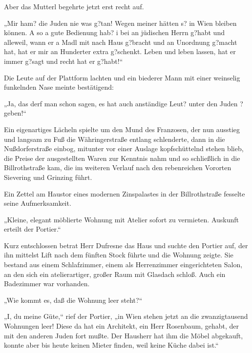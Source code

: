 Aber das Mutterl begehrte jetzt erst recht auf.

„Mir ham? die Juden nie was g?tan! Wegen meiner hätten s? in Wien
bleiben können. A so a gute Bedienung hab? i bei an jüdischen Herrn
g?habt und alleweil, wann er a Madl mit nach Haus g?bracht und an
Unordnung g?macht hat, hat er mir an Hunderter extra g?schenkt.
Leben und leben lassen, hat er immer g?sagt und recht hat er
g?habt!“

Die Leute auf der Plattform lachten und ein biederer Mann mit einer
weinselig funkelnden Nase meinte bestätigend:

„Ja, das derf man schon sagen, es hat auch anständige Leut? unter
den Juden ?geben!“

Ein eigenartiges Lächeln spielte um den Mund des Franzosen, der nun
ausstieg und langsam zu Fuß die Währingerstraße entlang
schlenderte, dann in die Nußdorferstraße einbog, mitunter vor einer
Auslage kopfschüttelnd stehen blieb, die Preise der ausgestellten
Waren zur Kenntnis nahm und so schließlich in die Billrothstraße
kam, die im weiteren Verlauf nach den rebenreichen Vororten
Sievering und Grinzing führt.

Ein Zettel am Haustor eines modernen Zinspalastes in der
Billrothstraße fesselte seine Aufmerksamkeit.

„Kleine, elegant möblierte Wohnung mit Atelier
sofort zu vermieten. Auskunft erteilt der Portier.“

Kurz entschlossen betrat Herr Dufresne das Haus und suchte den
Portier auf, der ihn mittelst Lift nach dem fünften Stock führte
und die Wohnung zeigte. Sie bestand aus einem Schlafzimmer, einem
als Herrenzimmer eingerichteten Salon, an den sich ein
atelierartiger, großer Raum mit Glasdach schloß. Auch ein
Badezimmer war vorhanden.

„Wie kommt es, daß die Wohnung leer steht?“

„I, du meine Güte,“ rief der Portier, „in Wien stehen jetzt an die
zwanzigtausend Wohnungen leer! Diese da hat ein Architekt, ein Herr
Rosenbaum, gehabt, der mit den anderen Juden fort mußte. Der
Hausherr hat ihm die Möbel abgekauft, konnte aber bis heute keinen
Mieter finden, weil keine Küche dabei ist.“

